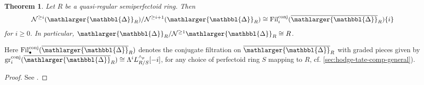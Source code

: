 \documentclass{amsart}
\newcommand{\prism}{{\mathlarger{\mathbbl{\Delta}}}}
\theoremstyle{plain}
\newtheorem{theorem}{Theorem}[subsection]
\theoremstyle{definition}
\newcommand{\orange}[1]{{\color{black}#1}}
\begin{document}
\begin{theorem}
  \label{sec:prism-cohom-quasi-theorem-identification-of-the-graded-pieces-of-nygaard-filtration} Let $R$ be a quasi-regular semiperfectoid ring. Then
  $$
  \mathcal{N}^{\geq i}(\prism_R)/\mathcal{N}^{\geq i+1}(\prism_R)\cong \mathrm{Fil}^{\mathrm{conj}}_i(\overline{\prism}_R)\{i\}
  $$
  for $i\geq 0$. In particular, $\prism_R/\mathcal{N}^{\geq 1}\prism_R\cong R$.
\end{theorem}

Here $\mathrm{Fil}^{\mathrm{conj}}_\bullet(\overline{\prism}_R)$ denotes the conjugate filtration on $\overline{\prism}_R$ with graded pieces given by $\mathrm{gr}_i^{\mathrm{conj}}(\overline{\prism}_R)\cong \Lambda^i{L}_{R/S}^{\wedge_p}[-i]$, for any choice of perfectoid ring $S$ mapping to $R$, \orange{cf. \ref{sec:hodge-tate-comp-general})}. 

\begin{proof}
  See \cite[Theorem 12.2]{bhatt_scholze_prisms_and_prismatic_cohomology}.
\end{proof}
\end{document}

